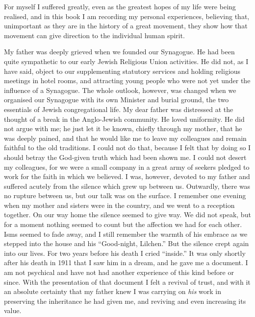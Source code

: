 For myself I suffered greatly, even as the greatest
hopes of my life were being realised, and in this book I
am recording my personal experiences, believing that,
unimportant as they are in the history of a great movement,
they show how that movement can give direction
to the individual human spirit.

My father was deeply grieved when we founded our
Synagogue. He had been quite sympathetic to our early
Jewish Religious Union activities. He did not, as I have
said, object to our supplementing statutory services and
holding religious meetings in hotel rooms, and attracting
young people who were not yet under the influence of a
Synagogue. The whole outlook, however, was changed
when we organised our Synagogue with its own Minister
and burial ground, the two essentials of Jewish congregational
life. My dear father was distressed at the thought
of a break in the Anglo-Jewish community. He loved
uniformity. He did not argue with me; he just let it be
known, chiefly through my mother, that he was deeply
pained, and that he would like me to leave my colleagues
and remain faithful to the old traditions. I could not do
that, because I felt that by doing so I should betray the
God-given truth which had been shown me. I could not
desert my colleagues, for we were a small company in a
great army of seekers pledged to work for the faith in
which we believed. I was, however, devoted to my
father and suffered acutely from the silence which grew
up between us. Outwardly, there was no rupture between
us, but our talk was on the surface. I remember one
evening when my mother and sisters were in the country,
and we went to a reception together. On our way home
the silence seemed to give way. We did not speak, but
for a moment nothing seemed to count but the affection
we had for each other. Isms seemed to fade away, and
I still remember the warmth of his embrace as we stepped
into the house and his “Good-night, Lilchen.” But
the silence crept again into our lives. For two years
before his death I cried “inside.” It was only shortly
after his death in 1911 that I saw him in a dream, and he
gave me a document. I am not psychical and have not had
another experience of this kind before or since. With the
presentation of that document I felt a revival of trust,
and with it an absolute certainty that my father knew I
was carrying on \textsl{his} work in preserving the inheritance
he had given me, and reviving and even increasing its
value.
